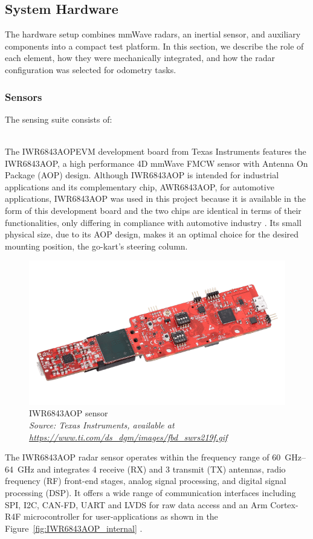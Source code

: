 \subsection{System Hardware}

The hardware setup combines mmWave radars, an inertial sensor, and auxiliary components into a compact test platform.  
In this section, we describe the role of each element, how they were mechanically integrated, and how the radar configuration was selected for odometry tasks.  

\subsubsection{Sensors}
The sensing suite consists of:  

\hfill
\\
The IWR6843AOPEVM development board from Texas Instruments features the IWR6843AOP, a high performance 4D mmWave FMCW sensor with Antenna On Package (AOP) design.
Although IWR6843AOP is intended for industrial applications and its complementary chip, AWR6843AOP, for automotive applications, IWR6843AOP was used in this project because it is available in the form of this development board and the two chips are identical in terms of their functionalities, only differing in compliance with automotive  industry \cite{iwr_awr_diff}.
Its small physical size, due to its AOP design, makes it an optimal choice for the desired mounting position, the go-kart's steering column.
\begin{figure}[!htbp]
    \centering
    \includegraphics[width=0.7\linewidth]{images/iwr6843aopevm-angled.png}
    \caption{IWR6843AOP sensor\\
    \textit{Source: Texas Instruments, available at \url{https://www.ti.com/ds_dgm/images/fbd_swrs219f.gif}}}
    \label{fig:IWR6843AOP sensor}
\end{figure}

\par
The IWR6843AOP radar sensor operates within the frequency range of \SIrange{60}{64}{\giga\hertz} and integrates 4 receive (RX) and 3 transmit (TX) antennas, radio frequency (RF) front-end stages, analog signal processing, and digital signal processing (DSP).
It offers a wide range of communication interfaces including SPI, I2C, CAN-FD, UART and LVDS for raw data access and an Arm Cortex-R4F microcontroller for user-applications as shown in the Figure~\ref{fig:IWR6843AOP_internal} \cite{dev_board_page}.

